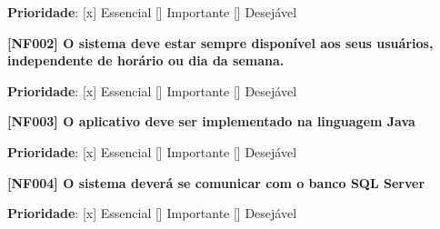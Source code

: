 \textbf{Prioridade}:      [x] Essencial        [] Importante     [] Desejável 



\textbf{[NF002] O sistema deve estar sempre disponível  aos seus usuários, independente de horário ou dia da semana. %
}

\textbf{Prioridade}:      [x] Essencial        [] Importante     [] Desejável 

\textbf{[NF003] O aplicativo deve ser implementado na linguagem Java}


\textbf{Prioridade}:      [x] Essencial        [] Importante     [] Desejável 





\textbf{[NF004] O sistema deverá se comunicar com o banco SQL Server}

\textbf{Prioridade}:      [x] Essencial        [] Importante     [] Desejável 

